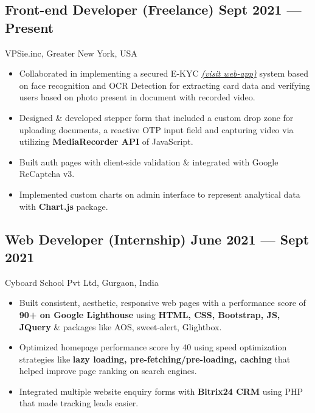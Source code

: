 \documentclass[a4,10pt]{article}
\newcommand{\subtext}[1]{
#1\par\vspace{-0.2cm}}
\newenvironment{zitemize}{
\begin{itemize}\itemsep0pt \parskip0pt \parsep1pt}
{\end{itemize}\vspace{-0.5cm}}
\begin{document}
\subsection*{Front-end Developer {\normalsize\normalfont (Freelance)} \hfill Sept 2021 --- Present} 
\subtext{VPSie.inc, Greater New York, USA} 
    \begin{zitemize}
        \item Collaborated in implementing a secured E-KYC \href{https://kyc.itpay.io/info/}{\normalsize\normalfont \textit{(visit web-app)}} system based on face recognition and OCR Detection for extracting card data and verifying users based on photo present in document with recorded video.
        \item Designed \& developed stepper form that included a custom drop zone for uploading documents, a reactive OTP input field and capturing video via utilizing \textbf{MediaRecorder API} of JavaScript.
        \item Built auth pages with client-side validation \& integrated with Google ReCaptcha v3.
        \item Implemented custom charts on admin interface to represent analytical data with \textbf{Chart.js} package.
    \end{zitemize}


\subsection*{Web Developer {\normalsize\normalfont (Internship)} \hfill June 2021 --- Sept 2021} 
\subtext{Cyboard School Pvt Ltd, Gurgaon, India} 
    \begin{zitemize}
        \item Built consistent, aesthetic, responsive web pages with a performance score of \textbf{90+ on Google Lighthouse}
        using \textbf{HTML, CSS, Bootstrap, JS, JQuery} \& packages like AOS, sweet-alert, Glightbox. 
        \item Optimized homepage performance score by 40 using speed optimization strategies like \textbf{lazy loading, pre-fetching/pre-loading, caching} that helped improve page ranking on search engines.
        \item Integrated multiple website enquiry forms with \textbf{Bitrix24 CRM} using PHP that made tracking leads easier.
    \end{zitemize}
\end{document}
